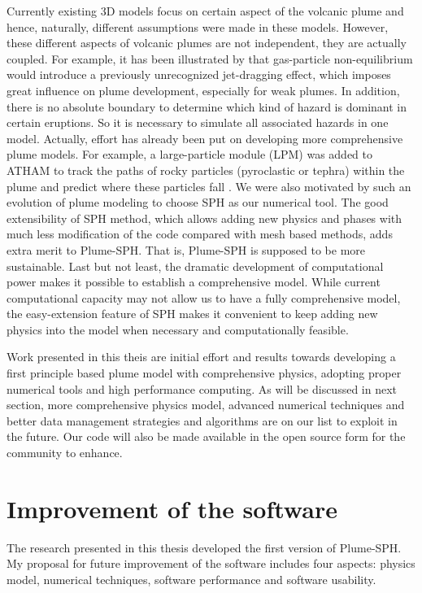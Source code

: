 Currently existing 3D models focus on certain aspect of the volcanic plume and hence, naturally, different assumptions were made in these models. However, these different aspects of volcanic plumes are not independent, they are actually coupled. For example, it has been illustrated by \cite{cerminara2016large} that gas-particle non-equilibrium would introduce a previously unrecognized jet-dragging effect, which imposes great influence on plume development, especially for weak plumes. In addition, there is no absolute boundary to determine which kind of hazard is dominant in certain eruptions. So it is necessary to simulate all associated hazards in one model. Actually, effort has already been put on developing more comprehensive plume models. For example, a large-particle module (LPM) was added to ATHAM to track the paths of rocky particles (pyroclastic or tephra) within the plume and predict where these particles fall \citep{kobs2009modeling}. We were also motivated by such an evolution of plume modeling to choose SPH as our numerical tool. The good extensibility of SPH method, which allows adding new physics and phases with much less modification of the code compared with mesh based methods, adds extra merit to Plume-SPH. That is, Plume-SPH is supposed to be more sustainable.
Last but not least, the dramatic development of computational power makes it possible to establish a comprehensive model. While current computational capacity may not allow us to have a fully comprehensive model, the easy-extension feature of SPH makes it convenient to keep adding new physics into the model when necessary and computationally feasible. 

Work presented in this theis are initial effort and results towards developing a first principle based plume model with comprehensive physics, adopting proper numerical tools and high performance computing. As will be discussed in next section, more comprehensive physics model, advanced numerical techniques and better data management strategies and algorithms are on our list to exploit in the future. Our code will also be made available in the open source form for the community to enhance.

\section{Improvement of the software}
The research presented in this thesis developed the first version of Plume-SPH.
My proposal for future improvement of the software includes four aspects: physics model, numerical techniques, software performance and software usability.

